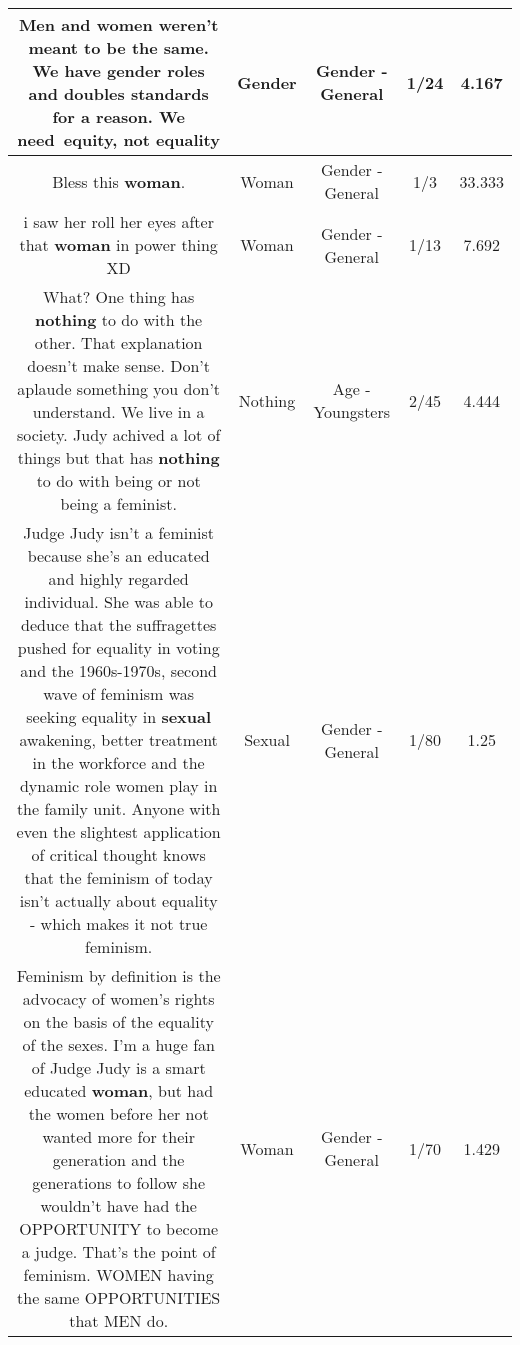 \documentclass[11pt]{article}
\newlength\mylength
\begin{document}
\begin{center}
\begin{longtable}{|C{.65\mylength}|C{.30\mylength}|C{.12\mylength}|C{.12\mylength}|C{.12\mylength}|}
  \small Men and women weren't meant to be the same. We have \textbf{gender} roles and doubles standards for a reason. We need equity, not equality\normalsize   & Gender & Gender - General & 1/24 & 4.167 \\  \hline
  \small Bless this \textbf{woman}.\normalsize   & Woman & Gender - General & 1/3 & 33.333 \\  \hline
  \small i saw her roll her eyes after that \textbf{woman} in power thing XD\normalsize   & Woman & Gender - General & 1/13 & 7.692 \\  \hline
  \small What? One thing has \textbf{nothing} to do with the other. That explanation doesn't make sense. Don't aplaude something you don't understand. We live in a society. Judy achived a lot of things but that has \textbf{nothing} to do with being or not being a feminist.\normalsize   & Nothing & Age - Youngsters & 2/45 & 4.444 \\  \hline
  \small Judge Judy isn't a feminist because she's an educated and highly regarded individual. She was able to deduce that the suffragettes pushed for equality in voting and the 1960s-1970s, second wave of feminism was seeking equality in \textbf{sexual} awakening, better treatment in the workforce and the dynamic role women play in the family unit. Anyone with even the slightest application of critical thought knows that the feminism of today isn't actually about equality - which makes it not true feminism.\normalsize   & Sexual & Gender - General & 1/80 & 1.25 \\  \hline
  \small Feminism by definition is the advocacy of women's rights on the basis of the equality of the sexes. I'm a huge fan of Judge Judy is a smart educated \textbf{woman}, but had the women before her not wanted more for their generation and the generations to follow she wouldn't have had the OPPORTUNITY to become a judge. That's the point of feminism. WOMEN having the same OPPORTUNITIES that MEN do.\normalsize   & Woman & Gender - General & 1/70 & 1.429 \\  \hline

\end{longtable}
\end{center}
\end{document}
